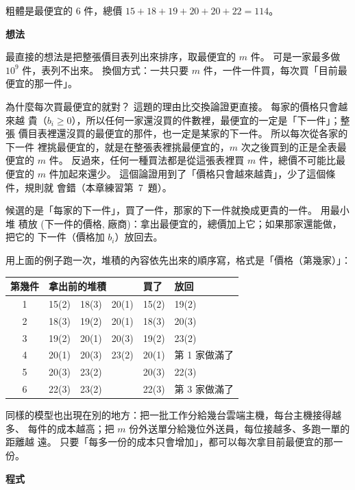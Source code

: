 粗體是最便宜的 $6$ 件，總價 $15 + 18 + 19 + 20 + 20 + 22 = 114$。

\textbf{想法}

最直接的想法是把整張價目表列出來排序，取最便宜的 $m$ 件。 可是一家最多做
$10^9$ 件，表列不出來。 換個方式：一共只要 $m$ 件，一件一件買，每次買「目前最
便宜的那一件」。

為什麼每次買最便宜的就對？ 這題的理由比交換論證更直接。 每家的價格只會越來越
貴（$b_i \ge 0$），所以任何一家還沒買的件數裡，最便宜的一定是「下一件」；整張
價目表裡還沒買的最便宜的那件，也一定是某家的下一件。 所以每次從各家的下一件
裡挑最便宜的，就是在整張表裡挑最便宜的，$m$ 次之後買到的正是全表最便宜的
$m$ 件。 反過來，任何一種買法都是從這張表裡買 $m$ 件，總價不可能比最便宜的
$m$ 件加起來還少。 這個論證用到了「價格只會越來越貴」，少了這個條件，規則就
會錯（本章練習第~7~題）。

候選的是「每家的下一件」，買了一件，那家的下一件就換成更貴的一件。 用最小堆
積放 (下一件的價格, 廠商)：拿出最便宜的，總價加上它；如果那家還能做，把它的
下一件（價格加 $b_i$）放回去。

用上面的例子跑一次，堆積的內容依先出來的順序寫，格式是「價格（第幾家）」：

\begin{center}
\begin{tabular}{clll}
\toprule
第幾件 & 拿出前的堆積 & 買了 & 放回 \\
\midrule
1 & 15(2)\ \ 18(3)\ \ 20(1) & 15(2) & 19(2) \\
2 & 18(3)\ \ 19(2)\ \ 20(1) & 18(3) & 20(3) \\
3 & 19(2)\ \ 20(1)\ \ 20(3) & 19(2) & 23(2) \\
4 & 20(1)\ \ 20(3)\ \ 23(2) & 20(1) & 第 1 家做滿了 \\
5 & 20(3)\ \ 23(2) & 20(3) & 22(3) \\
6 & 22(3)\ \ 23(2) & 22(3) & 第 3 家做滿了 \\
\bottomrule
\end{tabular}
\end{center}

同樣的模型也出現在別的地方：把一批工作分給幾台雲端主機，每台主機接得越多、
每件的成本越高；把 $m$ 份外送單分給幾位外送員，每位接越多、多跑一單的距離越
遠。 只要「每多一份的成本只會增加」，都可以每次拿目前最便宜的那一份。

\textbf{程式}

